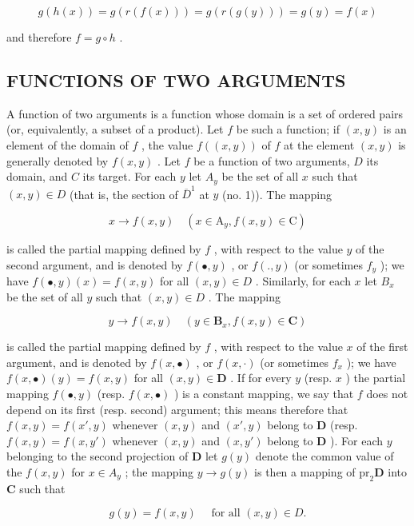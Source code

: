 \[
g (h (x)) = g (r (f (x))) = g (r (g (y))) = g (y) = f (x)
\]

and therefore \(f = g \circ h\) .

\subsection{FUNCTIONS OF TWO ARGUMENTS}

A function of two arguments is a function whose domain is a set of ordered pairs (or, equivalently, a subset of a product). Let \(f\) be such a function; if \((x, y)\) is an element of the domain of \(f\) , the value \(f((x, y))\) of \(f\) at the element \((x, y)\) is generally denoted by \(f(x, y)\) . Let \(f\) be a function of two arguments, \(D\) its domain, and \(C\) its target. For each \(y\) let \(A_y\) be the set of all \(x\) such that \((x, y) \in D\) (that is, the section of \(\overline{D}^1\) at \(y\) (no. 1)). The mapping

\[
x \rightarrow f (x, y) \quad (x \in \mathrm{A} _ {y}, f (x, y) \in \mathrm{C})
\]

is called the partial mapping defined by \(f\) , with respect to the value \(y\) of the second argument, and is denoted by \(f(\bullet, y)\) , or \(f(., y)\) (or sometimes \(f_y\) ); we have \(f(\bullet, y)(x) = f(x, y)\) for all \((x, y) \in D\) . Similarly, for each \(x\) let \(B_x\) be the set of all \(y\) such that \((x, y) \in D\) . The mapping

\[
y \rightarrow f (x, y) \quad (y \in \mathbf {B} _ {x}, f (x, y) \in \mathbf {C})
\]

is called the partial mapping defined by \(f\) , with respect to the value \(x\) of the first argument, and is denoted by \(f(x, \bullet)\) , or \(f(x, \cdot)\) (or sometimes \(f_x\) ); we have \(f(x, \bullet)(y) = f(x, y)\) for all \((x, y) \in \mathbf{D}\) . If for every \(y\) (resp. \(x\) ) the partial mapping \(f(\bullet, y)\) (resp. \(f(x, \bullet)\) ) is a constant mapping, we say that \(f\) does not depend on its first (resp. second) argument; this means therefore that \(f(x, y) = f(x', y)\) whenever \((x, y)\) and \((x', y)\) belong to \(\mathbf{D}\) (resp. \(f(x, y) = f(x, y')\) whenever \((x, y)\) and \((x, y')\) belong to \(\mathbf{D}\) ). For each \(y\) belonging to the second projection of \(\mathbf{D}\) let \(g(y)\) denote the common value of the \(f(x, y)\) for \(x \in A_y\) ; the mapping \(y \to g(y)\) is then a mapping of \(\mathrm{pr}_2\mathbf{D}\) into \(\mathbf{C}\) such that

\[
g (y) = f (x, y) \quad \text {   for   all   } (x, y) \in D.
\]

